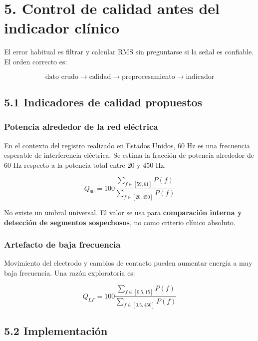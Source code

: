 \documentclass[
  spanish,
  a4paper,
  DIV=11,
  numbers=noendperiod]{scrreprt}
\begin{document}
\chapter{5. Control de calidad antes del indicador
clínico}\label{control-de-calidad-antes-del-indicador-cluxednico}

El error habitual es filtrar y calcular RMS sin preguntarse si la señal
es confiable. El orden correcto es:

\[
\text{dato crudo} \rightarrow \text{calidad} \rightarrow \text{preprocesamiento} \rightarrow \text{indicador}
\]

\section{5.1 Indicadores de calidad
propuestos}\label{indicadores-de-calidad-propuestos}

\subsection{Potencia alrededor de la red
eléctrica}\label{potencia-alrededor-de-la-red-eluxe9ctrica}

En el contexto del registro realizado en Estados Unidos, 60 Hz es una
frecuencia esperable de interferencia eléctrica. Se estima la fracción
de potencia alrededor de 60 Hz respecto a la potencia total entre 20 y
450 Hz.

\[
Q_{60}=100\frac{\sum_{f\in[59,61]}P(f)}{\sum_{f\in[20,450]}P(f)}
\]

No existe un umbral universal. El valor se usa para \textbf{comparación
interna y detección de segmentos sospechosos}, no como criterio clínico
absoluto.

\subsection{Artefacto de baja
frecuencia}\label{artefacto-de-baja-frecuencia}

Movimiento del electrodo y cambios de contacto pueden aumentar energía a
muy baja frecuencia. Una razón exploratoria es:

\[
Q_{LF}=100\frac{\sum_{f\in[0.5,15]}P(f)}{\sum_{f\in[0.5,450]}P(f)}
\]

\section{5.2 Implementación}\label{implementaciuxf3n}
\end{document}
